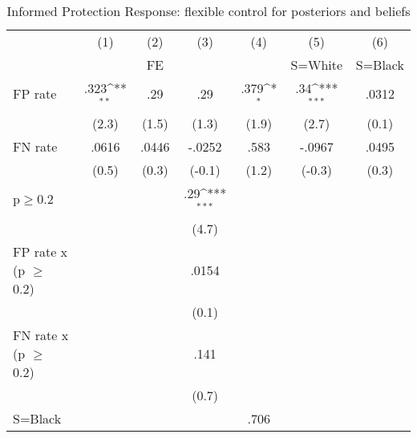 \begin{table}[htbp]\centering
\def\sym#1{\ifmmode^{#1}\else\(^{#1}\)\fi}
\caption{Informed Protection Response: flexible control for posteriors and beliefs}
\begin{tabular}{l*{6}{c}}
\hline\hline
                &\multicolumn{1}{c}{(1)}&\multicolumn{1}{c}{(2)}&\multicolumn{1}{c}{(3)}&\multicolumn{1}{c}{(4)}&\multicolumn{1}{c}{(5)}&\multicolumn{1}{c}{(6)}\\
                &\multicolumn{1}{c}{}&\multicolumn{1}{c}{FE}&\multicolumn{1}{c}{}&\multicolumn{1}{c}{}&\multicolumn{1}{c}{S=White}&\multicolumn{1}{c}{S=Black}\\
\hline
FP rate         &     .323\sym{**} &      .29         &      .29         &     .379\sym{*}  &      .34\sym{***}&    .0312         \\
                &    (2.3)         &    (1.5)         &    (1.3)         &    (1.9)         &    (2.7)         &    (0.1)         \\
FN rate         &    .0616         &    .0446         &   -.0252         &     .583         &   -.0967         &    .0495         \\
                &    (0.5)         &    (0.3)         &   (-0.1)         &    (1.2)         &   (-0.3)         &    (0.3)         \\
p$\geq$0.2      &                  &                  &      .29\sym{***}&                  &                  &                  \\
                &                  &                  &    (4.7)         &                  &                  &                  \\
FP rate x (p $\geq$ 0.2)&                  &                  &    .0154         &                  &                  &                  \\
                &                  &                  &    (0.1)         &                  &                  &                  \\
FN rate x (p $\geq$ 0.2)&                  &                  &     .141         &                  &                  &                  \\
                &                  &                  &    (0.7)         &                  &                  &                  \\
S=Black         &                  &                  &                  &     .706         &                  &                  \\

\end{tabular}
\end{table}
